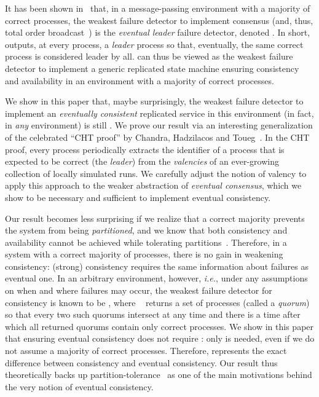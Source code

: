 \documentclass[11pt]{article}
\begin{document}
It has been shown in~\cite{CHT96} that, in a message-passing environment with
a majority of correct processes, the weakest failure detector to
implement consensus (and, thus, total order broadcast~\cite{CT94}) is the \emph{eventual
  leader} failure detector, denoted . In short,  outputs, at
every process, a \emph{leader} process so that, eventually, the same
correct process is considered leader by all.
 can thus be viewed as the weakest failure detector to implement a
generic replicated state machine ensuring
consistency and availability in an environment with a majority of correct
processes.

We show in this paper that, maybe
surprisingly, the weakest failure detector to implement an
\emph{eventually consistent}  replicated service in this environment
(in fact, in \emph{any} environment) is still .
We prove our result via an interesting generalization of the
celebrated ``CHT proof'' by Chandra, Hadzilacos and Toueg~\cite{CHT96}.
In the CHT proof, every process periodically extracts the identifier of a process that is
expected to be correct (the \emph{leader}) from the \emph{valencies} of an ever-growing collection
of locally simulated runs. 
We carefully adjust the notion of valency to apply this approach to the weaker
abstraction of \emph{eventual consensus}, which we show to be necessary
and sufficient to implement eventual consistency.

Our result becomes less surprising if we
realize that a correct majority prevents the system from being
\emph{partitioned}, and we know that both consistency and availability
cannot be achieved while tolerating partitions~\cite{Bre00,GL02,DFG10}.
Therefore, in a system with a correct majority of processes, there is no gain in
weakening consistency:  (strong) consistency requires the same
information about failures as eventual one.
In an arbitrary environment, however, {\em i.e.}, under any
assumptions on when and where failures may occur,
the weakest failure detector for consistency is known to be ,
where ~\cite{DFG10}
returns a set of processes (called a \emph{quorum}) so that every
two such quorums intersect at any time and there is a time after which
all returned quorums contain only correct processes.
We show in this paper that ensuring eventual consistency does not
require : only  is needed,  even if we do not assume a
 majority of correct processes. Therefore, 
represents the exact difference
between consistency and eventual consistency.
Our result thus theoretically backs up partition-tolerance~\cite{Bre00,GL02} as one of the main motivations
behind the very notion of eventual consistency.
\end{document}
